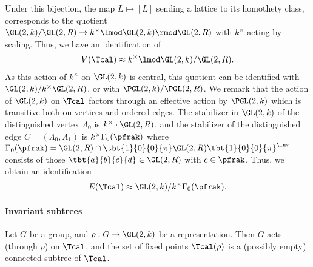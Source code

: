 \documentclass[draft]{article}
\begin{document}
Under this bijection, the map $L\mapsto [L]$ sending a lattice to its homothety class, corresponds to the quotient $\GL(2,k) / \GL(2,R) \to k^\times \lmod \GL(2,k) \rmod \GL(2,R)$ with $k^\times$ acting by scaling. Thus, we have an identification of 
\begin{align*}
	V(\Tcal) \approx k^\times \lmod \GL(2,k)/\GL(2,R).
\end{align*} 
As this action of $k^\times$ on $\GL(2,k)$ is central, this quotient can be identified with $\GL(2,k)/k^\times\GL(2,R)$, or with $\PGL(2,k)/\PGL(2,R)$. We remark that the action of $\GL(2,k)$ on $\Tcal$ factors through an effective action by $\PGL(2,k)$ which is transitive both on vertices and ordered edges. The stabilizer in $\GL(2,k)$ of the distinguished vertex $\Lambda_0$ is $k^\times \cdot \GL(2,R)$, and the stabilizer of the distinguished edge $C = (\Lambda_0,\Lambda_1)$ is $k^\times \Gamma_0(\pfrak)$ where $\Gamma_0(\pfrak)=\GL(2,R)\cap \tbt{1}{0}{0}{\pi}\GL(2,R)\tbt{1}{0}{0}{\pi}^\inv$ consists of those $\tbt{a}{b}{c}{d} \in \GL(2,R)$  with $c \in \pfrak$. Thus, we obtain an identification 
\begin{align*}
    E(\Tcal)\approx  \GL(2,k) / k^\times \Gamma_0(\pfrak). 
\end{align*}

\paragraph*{Invariant subtrees}
Let $G$ be a group, and $\rho: G \to \GL(2,k)$ be a representation. Then $G$ acts (through $\rho$) on $\Tcal$, and the set of fixed points $\Tcal(\rho)$ is a (possibly empty) connected subtree of $\Tcal$.


 
\end{document}
